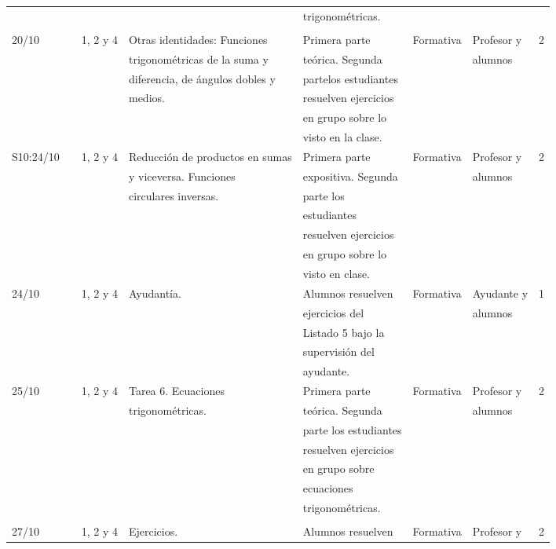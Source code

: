 \documentclass[11pt]{article}
\begin{document}
{\begin{center}
\begin{longtable}{|l|l|l|l|l|l|l|l|}
 & & & & trigonométricas. & & & \\
 & & & & & & & \\
\hline
20/10 & & 1, 2 y 4 & Otras identidades: Funciones & Primera parte & Formativa & Profesor y & 2 \\
 & & & trigonométricas de la suma y & teórica. Segunda & & alumnos & \\
 & & & diferencia, de ángulos dobles y & partelos estudiantes & & & \\
 & & & medios. & resuelven ejercicios & & & \\
 & & & & en grupo sobre lo & & & \\
 & & & & visto en la clase. & & & \\
\hline
S10:24/10 & & 1, 2 y 4 & Reducción de productos en sumas & Primera parte & Formativa & Profesor y & 2 \\
 & & & y viceversa. Funciones & expositiva. Segunda & & alumnos & \\
 & & & circulares inversas. & parte los & & & \\
 & & & & estudiantes & & & \\
 & & & & resuelven ejercicios & & & \\
 & & & & en grupo sobre lo & & & \\
 & & & & visto en clase. & & & \\
\hline
24/10 & & 1, 2 y 4 & Ayudantía. & Alumnos resuelven & Formativa & Ayudante y & 1 \\
 & & & & ejercicios del & & alumnos & \\
 & & & & Listado 5 bajo la & & & \\
 & & & & supervisión del & & & \\
 & & & & ayudante. & & & \\
\hline
25/10 & & 1, 2 y 4 & Tarea 6. Ecuaciones & Primera parte & Formativa & Profesor y & 2 \\
 & & & trigonométricas. & teórica. Segunda & & alumnos & \\
 & & & & parte los estudiantes & & & \\
 & & & & resuelven ejercicios & & & \\
 & & & & en grupo sobre & & & \\
 & & & & ecuaciones & & & \\
 & & & & trigonométricas. & & & \\
 & & & & & & & \\
\hline
27/10 & & 1, 2 y 4 & Ejercicios. & Alumnos resuelven & Formativa & Profesor y & 2 \\

\end{longtable}
\end{center}}
\end{document}
